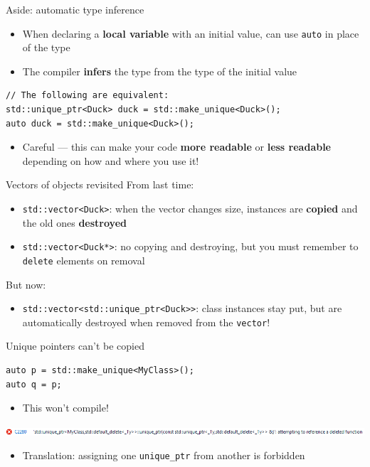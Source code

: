 \begin{frame}[fragile]{Aside: automatic type inference}
    \begin{itemize}
        \item When declaring a \textbf{local variable} with an initial value,
            can use \lstinline{auto} in place of the type \pause
        \item The compiler \textbf{infers} the type from the type of the initial value \pause
    \end{itemize}
    \begin{lstlisting}
// The following are equivalent:
std::unique_ptr<Duck> duck = std::make_unique<Duck>();
auto duck = std::make_unique<Duck>();
    \end{lstlisting} \pause
    \begin{itemize}
        \item Careful --- this can make your code \textbf{more readable} or \textbf{less readable}
            depending on how and where you use it!
    \end{itemize}
\end{frame}

\begin{frame}{Vectors of objects revisited}
    From last time: \pause
    \begin{itemize}
        \item \lstinline{std::vector<Duck>}: when the vector changes size, instances are 
            \textbf{copied} and the old ones \textbf{destroyed} \pause
        \item \lstinline{std::vector<Duck*>}: no copying and destroying, but you must
            remember to \lstinline{delete} elements on removal \pause
    \end{itemize}
    But now: \pause
    \begin{itemize}
        \item \lstinline{std::vector<std::unique_ptr<Duck>>}: class instances stay put,
            but are automatically destroyed when removed from the \lstinline{vector}!
    \end{itemize}
\end{frame}

\begin{frame}[fragile]{Unique pointers can't be copied}
    \begin{lstlisting}
auto p = std::make_unique<MyClass>();
auto q = p;
    \end{lstlisting} \pause
    \begin{itemize}
        \item This won't compile! \pause
    \end{itemize}
    \includegraphics[width=\textwidth]{unique_ptr_error} \pause
    \begin{itemize}
        \item Translation: assigning one \lstinline{unique_ptr} from another is forbidden
    \end{itemize}
\end{frame}

